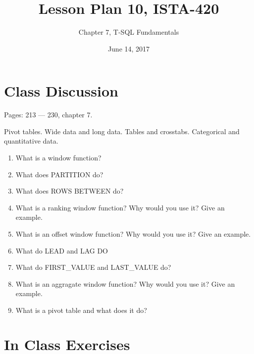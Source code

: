 \documentclass{article}
\title{Lesson Plan 10, ISTA-420}
\author{Chapter 7, T-SQL Fundamentals}
\date{June 14, 2017}
\begin{document}
    

    \maketitle{}

    \section{Class Discussion}

    Pages: 213 --- 230, chapter 7.

    Pivot tables. Wide data and long data. Tables and crosstabs. Categorical and quantitative data.

    \begin{enumerate}
        \item What is a window function?
        \item What does PARTITION do?
        \item What does ROWS BETWEEN do?
        \item What is a ranking window function? Why would you use it? Give an example.
        \item What is an offset window function? Why would you use it? Give an example.
        \item What do LEAD and LAG DO
        \item What do FIRST\_VALUE and LAST\_VALUE do?
        \item What is an aggragate window function? Why would you use it? Give an example.
        \item What is a pivot table and what does it do?
    \end{enumerate}

    \section{In Class Exercises}
\end{document}
